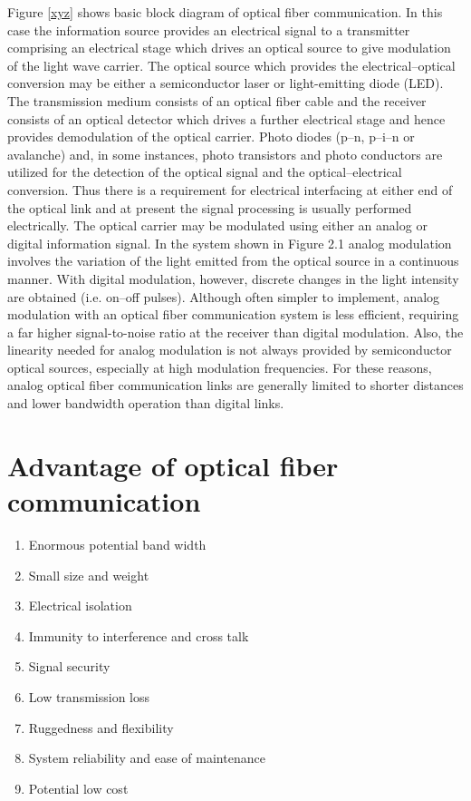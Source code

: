 \documentclass[12pt]{report}
\begin{document}
	Figure \ref{xyz} shows basic block diagram of optical fiber communication. In this case the information source provides an electrical signal to a transmitter comprising an electrical stage which drives an optical source to give modulation of the light wave carrier. The optical source which provides the electrical–optical conversion may be either a semiconductor laser or light-emitting diode (LED). The transmission medium consists of an optical fiber cable and the receiver consists of an optical detector which drives a further electrical stage and hence provides demodulation of the optical carrier. Photo diodes (p–n, p–i–n or avalanche) and, in some instances, photo transistors and photo conductors are utilized for the detection of the optical signal and the optical–electrical conversion. Thus there is a requirement for electrical interfacing at either end of the optical link and at present the signal processing is usually performed electrically. The optical carrier may be modulated using either an analog or digital information signal. In the system shown in Figure 2.1 analog modulation involves the variation of the light emitted from the optical source in a continuous manner. With digital modulation, however, discrete changes in the light intensity are obtained (i.e. on–off pulses). Although often simpler to implement, analog modulation with an optical fiber communication system is less efficient, requiring a far higher signal-to-noise ratio at the receiver than digital modulation. Also, the linearity needed for analog modulation is not always provided by semiconductor optical sources, especially at high modulation frequencies. For these reasons, analog optical fiber communication links are generally limited to shorter distances and lower bandwidth operation than digital links.
	\section{Advantage of optical fiber communication }
	\begin{enumerate}
			\item Enormous potential band width 
			\item  Small size and weight 
			\item  Electrical isolation 
			\item  Immunity to interference and cross talk 
			\item  Signal security 
			\item  Low transmission loss 
			\item  Ruggedness and flexibility 
			\item  System reliability and ease of maintenance 
			\item  Potential low cost
	\end{enumerate}
 
\end{document}
